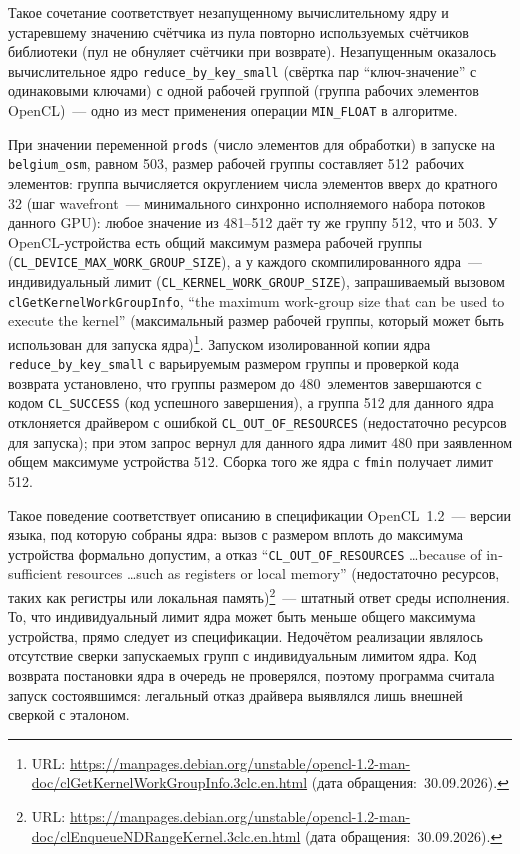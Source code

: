 \documentclass[a4paper]{article}
\begin{document}
Такое сочетание соответствует незапущенному вычислительному ядру и устаревшему значению счётчика из пула повторно используемых счётчиков библиотеки (пул не обнуляет счётчики при возврате). Незапущенным оказалось вычислительное ядро \texttt{reduce\_by\_key\_small} (свёртка пар \enquote{ключ-значение} с одинаковыми ключами) с одной рабочей группой (группа рабочих элементов OpenCL)~--- одно из мест применения операции \texttt{MIN\_FLOAT} в алгоритме.

При значении переменной \texttt{prods} (число элементов для обработки) в запуске на \texttt{belgium\_osm}, равном 503, размер рабочей группы составляет 512~рабочих элементов: группа вычисляется округлением числа элементов вверх до кратного 32 (шаг wavefront~--- минимального синхронно исполняемого набора потоков данного GPU): любое значение из 481--512 даёт ту же группу 512, что и 503. У OpenCL-устройства есть общий максимум размера рабочей группы (\texttt{CL\_DEVICE\_MAX\_WORK\_GROUP\_SIZE}), а у каждого скомпилированного ядра~--- индивидуальный лимит (\texttt{CL\_KERNEL\_WORK\_GROUP\_SIZE}), запрашиваемый вызовом \texttt{clGetKernelWorkGroupInfo}, \foreignquote{english}{the maximum work-group size that can be used to execute the kernel} (максимальный размер рабочей группы, который может быть использован для запуска ядра)\footnote{URL: \url{https://manpages.debian.org/unstable/opencl-1.2-man-doc/clGetKernelWorkGroupInfo.3clc.en.html} (дата обращения:~30.09.2026).}. Запуском изолированной копии ядра \texttt{reduce\_by\_key\_small} с варьируемым размером группы и проверкой кода возврата установлено, что группы размером до 480~элементов завершаются с кодом \texttt{CL\_SUCCESS} (код успешного завершения), а группа 512 для данного ядра отклоняется драйвером с ошибкой \texttt{CL\_OUT\_OF\_RESOURCES} (недостаточно ресурсов для запуска); при этом запрос вернул для данного ядра лимит 480 при заявленном общем максимуме устройства 512. Сборка того же ядра с \texttt{fmin} получает лимит 512.

Такое поведение соответствует описанию в спецификации OpenCL~1.2~--- версии языка, под которую собраны ядра: вызов с размером вплоть до максимума устройства формально допустим, а отказ \foreignquote{english}{\texttt{CL\_OUT\_OF\_RESOURCES} \dots because of insufficient resources \dots such as registers or local memory} (недостаточно ресурсов, таких как регистры или локальная память)\footnote{URL: \url{https://manpages.debian.org/unstable/opencl-1.2-man-doc/clEnqueueNDRangeKernel.3clc.en.html} (дата обращения:~30.09.2026).}~--- штатный ответ среды исполнения. То, что индивидуальный лимит ядра может быть меньше общего максимума устройства, прямо следует из спецификации. Недочётом реализации являлось отсутствие сверки запускаемых групп с индивидуальным лимитом ядра. Код возврата постановки ядра в очередь не проверялся, поэтому программа считала запуск состоявшимся: легальный отказ драйвера выявлялся лишь внешней сверкой с эталоном.
\end{document}
